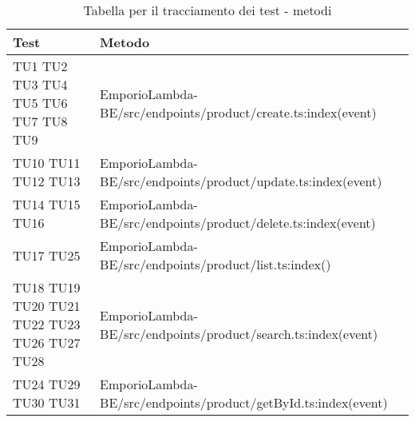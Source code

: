 {

\centering
\renewcommand{\arraystretch}{2}
\begin{longtable}{C{2cm} C{12.8cm}}
\caption{Tabella per il tracciamento dei test - metodi}\\
\textbf{Test} &
\textbf{Metodo}\\
\endhead


TU1 \newline TU2 \newline TU3 \newline TU4 \newline TU5 \newline TU6 \newline TU7 \newline TU8 \newline TU9 & EmporioLambda-BE/src/endpoints/product/create.ts:index(event)\\

TU10 \newline TU11 \newline TU12 \newline TU13 & EmporioLambda-BE/src/endpoints/product/update.ts:index(event)\\

TU14 \newline TU15 \newline TU16 & EmporioLambda-BE/src/endpoints/product/delete.ts:index(event)\\

TU17 \newline TU25 & EmporioLambda-BE/src/endpoints/product/list.ts:index()\\

TU18 \newline TU19 \newline TU20 \newline TU21 \newline TU22 \newline TU23 \newline TU26 \newline TU27 \newline TU28 & EmporioLambda-BE/src/endpoints/product/search.ts:index(event)\\

TU24 \newline TU29 \newline TU30 \newline TU31 & EmporioLambda-BE/src/endpoints/product/getById.ts:index(event)\\


\end{longtable}}
